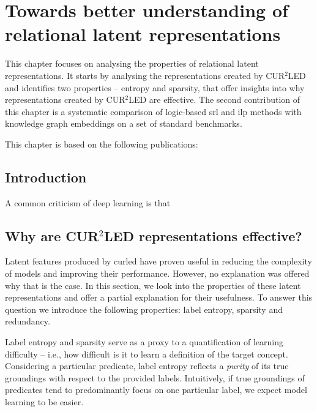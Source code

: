 \chapter{Towards better understanding of relational latent representations}\label{ch:embeddinganalysis}


This chapter focuses on analysing the properties of relational latent representations.
It starts by analysing the representations created by CUR$^2$LED and identifies two properties -- entropy and sparsity, that offer insights into why representations created by CUR$^2$LED are effective.
The second contribution of this chapter is a systematic comparison of logic-based \gls{srl} and \gls{ilp} methods with knowledge graph embeddings on a set of standard benchmarks.

This chapter is based on the following publications:

\begin{quote}
\end{quote}


\begin{quote}
\end{quote}

\begin{quote}
\end{quote}

\section{Introduction}


A common criticism of deep learning is that 



\section{Why are CUR$^2$LED representations effective?}

Latent features produced by \gls{curled} have proven useful in reducing the complexity of models and improving their performance.
However, no explanation was offered why that is the case.
In this section, we look into the properties of these latent representations and offer a partial explanation for their usefulness.
To answer this question we introduce the following properties: label entropy, sparsity and redundancy.



Label entropy and sparsity serve as a proxy to a quantification of learning difficulty -- i.e., how difficult is it to learn a definition of the target concept.
Considering a particular predicate, label entropy reflects a \textit{purity} of its true groundings with respect to the provided labels.
Intuitively, if true groundings of predicates tend to predominantly focus on one particular label, we expect model learning to be easier.


